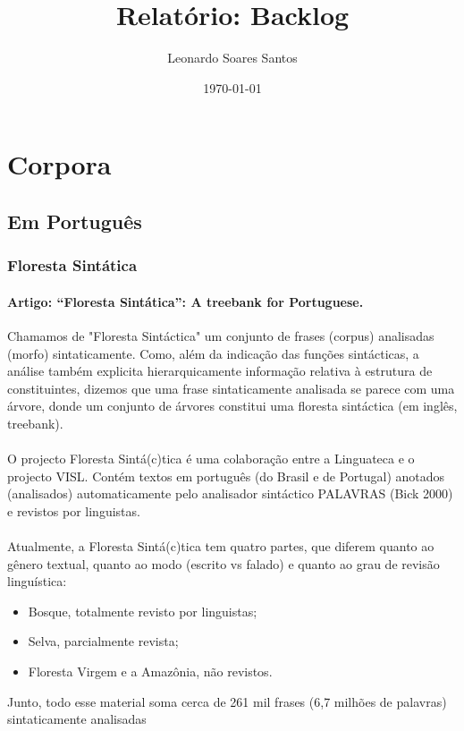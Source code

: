 \documentclass[a4paper, 10pt]{article}
\begin{document}
	\title{Relatório: Backlog}
	\author{Leonardo Soares Santos}
	\date{\today}
	
	\maketitle	
	\section{Corpora}
    	\subsection{Em Português}
        	\subsubsection{Floresta Sintática}
            
            	\paragraph{Artigo: “Floresta Sintática”: A treebank for Portuguese.}
            	Chamamos de "Floresta Sintáctica" um conjunto de frases (corpus) analisadas 
            	(morfo) sintaticamente. Como, além da indicação das funções sintácticas, a análise também explicita hierarquicamente 
            	informação relativa à estrutura de constituintes, dizemos que uma frase sintaticamente analisada se parece com uma árvore, donde um conjunto de árvores constitui uma floresta sintáctica (em inglês, treebank).
            	\paragraph{} O projecto Floresta Sintá(c)tica é uma colaboração entre a Linguateca e o projecto VISL. Contém textos em português (do Brasil e de Portugal) anotados (analisados) automaticamente pelo analisador sintáctico PALAVRAS (Bick 2000) e revistos por linguistas.
            	\paragraph{} Atualmente, a Floresta Sintá(c)tica tem quatro partes, que diferem quanto ao gênero textual, quanto ao modo (escrito vs falado) e quanto ao grau de revisão linguística: 
            \begin{itemize}
				\item Bosque, totalmente revisto por linguistas;
                \item Selva, parcialmente revista;
                \item Floresta Virgem e a Amazônia, não revistos.
			\end{itemize}
             Junto, todo esse material soma cerca de 261 mil frases (6,7 milhões de palavras) sintaticamente analisadas
\end{document}
